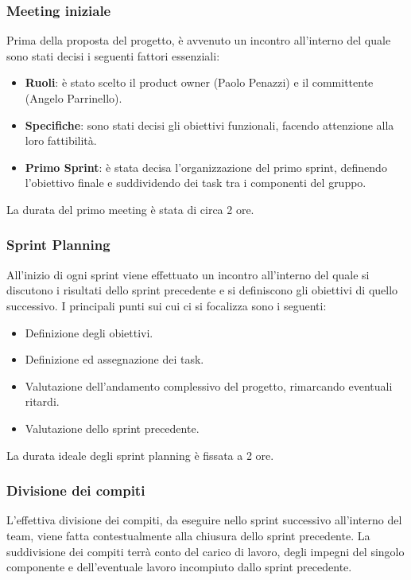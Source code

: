 \subsubsection{Meeting iniziale}
Prima della proposta del progetto, è avvenuto un incontro all'interno del quale sono stati decisi i seguenti fattori essenziali:
\begin{itemize}
    \item \textbf{Ruoli}: è stato scelto il product owner (Paolo Penazzi) e il committente (Angelo Parrinello).
    \item \textbf{Specifiche}: sono stati decisi gli obiettivi funzionali, facendo attenzione alla loro fattibilità.
    \item \textbf{Primo Sprint}: è stata decisa l'organizzazione del primo sprint, definendo l'obiettivo finale e suddividendo dei task tra i componenti del gruppo.
\end{itemize}
La durata del primo meeting è stata di circa 2 ore.

\subsubsection{Sprint Planning}
All'inizio di ogni sprint viene effettuato un incontro all'interno del quale si discutono i
risultati dello sprint precedente e si definiscono gli obiettivi di quello successivo.
I principali punti sui cui ci si focalizza sono i seguenti:
\begin{itemize}
    \item Definizione degli obiettivi.
    \item Definizione ed assegnazione dei task.
    \item Valutazione dell'andamento complessivo del progetto, rimarcando eventuali ritardi.
    \item Valutazione dello sprint precedente.
\end{itemize}

La durata ideale degli sprint planning è fissata a 2 ore.

\subsubsection{Divisione dei compiti}
L'effettiva divisione dei compiti, da eseguire nello sprint successivo all'interno del team, viene fatta
contestualmente alla chiusura dello sprint precedente. La suddivisione dei compiti terrà conto del carico di lavoro, degli
impegni del singolo componente e dell'eventuale lavoro incompiuto dallo sprint precedente.

